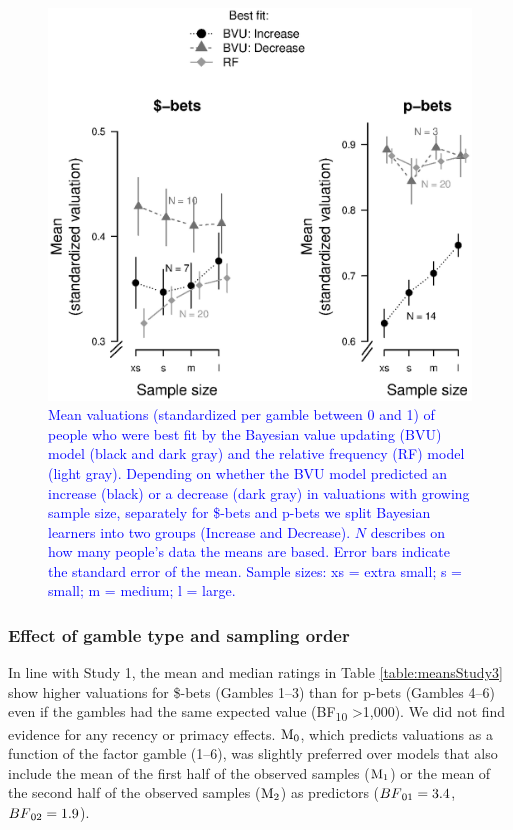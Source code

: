 \documentclass[a4paper, man, natbib, floatsintext]{apa6} %
\begin{document}
\begin{figure}[htbp] 
  \centering
\includegraphics[width=.8\linewidth, keepaspectratio]{groupqual2_stand.eps}
  \caption{\textcolor{blue}{Mean valuations (standardized per gamble between 0 and 1) of people who were best fit by the Bayesian value updating (BVU) model (black and dark gray) and the relative frequency (RF) model (light gray). Depending on whether the BVU model predicted an increase (black) or a decrease (dark gray) in valuations with growing sample size, separately for \$-bets and p-bets we split Bayesian learners into two groups (Increase and Decrease). $N$ describes on how many people's data the means are based. Error bars indicate the standard error of the mean. Sample sizes: xs = extra small; s = small; m = medium; l = large. }}
  \label{fig:qual2}
\end{figure}



\subsubsection{Effect of gamble type and sampling order}
In line with Study 1, the mean and median ratings in Table \ref{table:meansStudy3} show higher valuations for \$-bets (Gambles 1--3) than for p-bets (Gambles 4--6)  even if the gambles had the same expected value (BF\textsubscript{10} \textgreater 1,000). We did not find evidence for any recency or primacy effects. $\mathrm{M}\textsubscript{0}$, which predicts valuations as a function of the factor gamble (1--6), was slightly preferred over models that also include the mean of the first half of the observed samples ($\mathrm{M}\textsubscript{1}$) or the mean of the second half of the observed samples ($\mathrm{M}\textsubscript{2}$) as predictors ($BF\textsubscript{01} = 3.4$, $BF\textsubscript{02} = 1.9$). 
\end{document}
